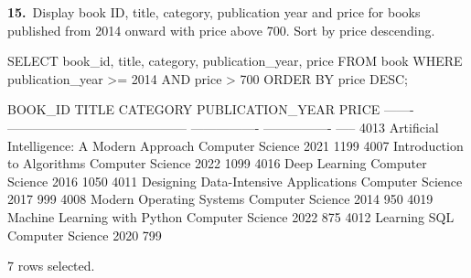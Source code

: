 \noindent\begin{minipage}{\linewidth}
\begingroup{}
{\fontsize{14}{17}\selectfont\textbf{15.}}\ Display book ID, title, category, publication year and price for books published from 2014 onward with price above 700. Sort by price descending.\par
\endgroup\vspace{12pt}


\begin{sqlcode}
SELECT book_id, title, category, publication_year, price
FROM book
WHERE publication_year >= 2014
  AND price > 700
ORDER BY price DESC;
\end{sqlcode}

\vspace{18pt}


\begin{sqlout}[fontsize=\footnotesize]
BOOK_ID  TITLE                                       CATEGORY          PUBLICATION_YEAR  PRICE
-------  ------------------------------------------  ----------------  ----------------  -----
   4013  Artificial Intelligence: A Modern Approach  Computer Science              2021   1199
   4007  Introduction to Algorithms                  Computer Science              2022   1099
   4016  Deep Learning                               Computer Science              2016   1050
   4011  Designing Data-Intensive Applications       Computer Science              2017    999
   4008  Modern Operating Systems                    Computer Science              2014    950
   4019  Machine Learning with Python                Computer Science              2022    875
   4012  Learning SQL                                Computer Science              2020    799

7 rows selected.
\end{sqlout}
\end{minipage}\par\vspace{24pt}


